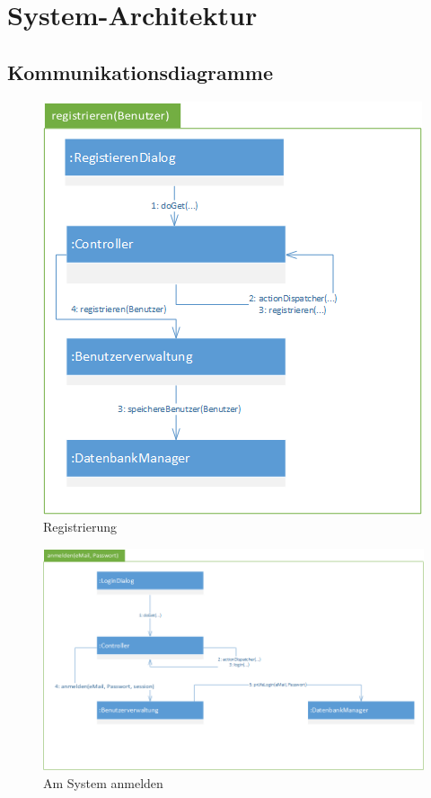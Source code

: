 \documentclass[12pt]{scrreprt}
\begin{document}
\chapter{System-Architektur}
\section{Kommunikationsdiagramme}
\begin{figure}[h]
	\centering
	\includegraphics[width=0.7\linewidth]{Bilder/Kommunikationsdiagramme/registrieren}
	\caption{Registrierung}
	\label{Registrierung}
\end{figure}

\begin{figure}[h]
	\centering
	\includegraphics[width=\linewidth]{Bilder/Kommunikationsdiagramme/anmelden}
	\caption{Am System anmelden}
	\label{Am System anmelden}
\end{figure}
\end{document}
